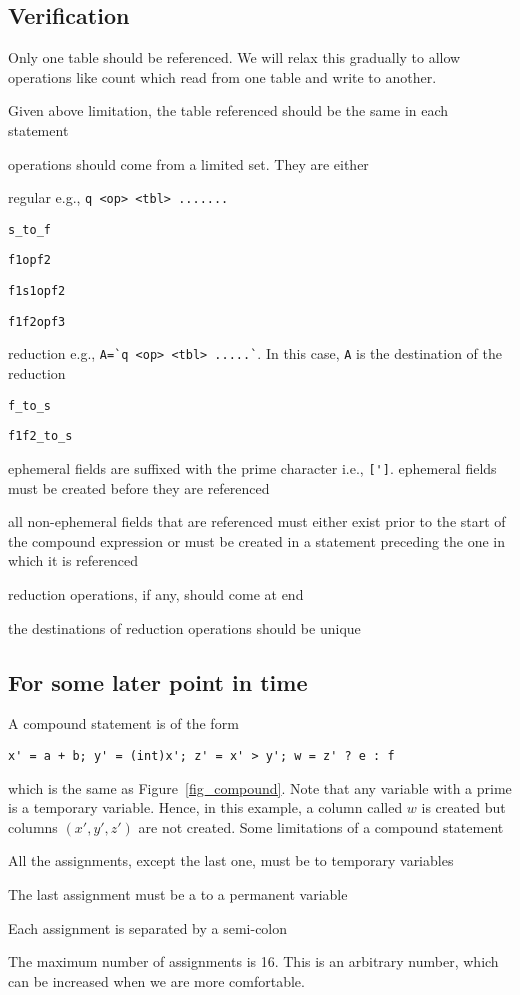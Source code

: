 \subsection{Verification}
\be
\item Only one table should be referenced. We will relax this gradually
to allow operations like count which read from one table and write to
another. 
\item Given above limitation, the table referenced should be the same in
each statement 
\item operations should come from a limited set. They are either 
\be
\item regular e.g., \verb+q <op> <tbl> .......+
\be
\item \verb+s_to_f+
\item \verb+f1opf2+
\item \verb+f1s1opf2+
\item \verb+f1f2opf3+
\ee
\item reduction e.g., \verb+A=`q <op> <tbl> .....`+. In this case,
{\tt A} is the destination of the reduction 
\be
\item \verb+f_to_s+
\item \verb+f1f2_to_s+
\ee
\ee
\item ephemeral fields are suffixed with the prime character i.e.,
  \verb+[']+. ephemeral fields must be created before they are referenced 
\item all non-ephemeral fields that are referenced must either exist
prior to the start of the compound expression or must be created in a
statement preceding the one in which it is referenced
\item reduction operations, if any, should come at end
\item the destinations of reduction operations should be unique
\ee



\subsection{For some later point in time}

A compound statement is of the form
\begin{verbatim}
x' = a + b; y' = (int)x'; z' = x' > y'; w = z' ? e : f
\end{verbatim}
which is the same as Figure~\ref{fig_compound}. Note that any variable
with a prime is a temporary variable. Hence, in this example, a column
called \(w\) is created but columns \((x', y', z')\) are not created.
Some limitations of a compound statement
\be
\item All the assignments, except the last one, must be to temporary
variables
\item The last assignment must be a to a permanent variable
\item Each assignment is separated by a semi-colon
\item The maximum number of assignments is 16. This is an arbitrary
number, which can be increased when we are more comfortable.
\ee




